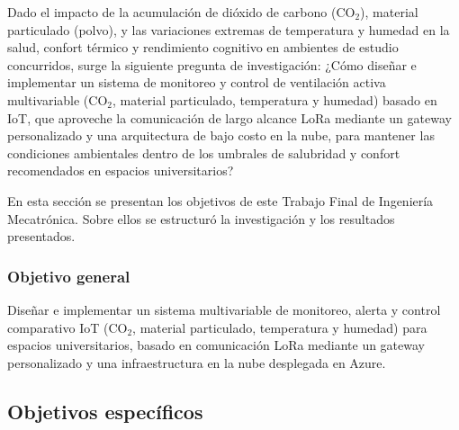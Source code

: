 Dado el impacto de la acumulación de dióxido de carbono (CO\(_2\)), material particulado (polvo), y las variaciones extremas de temperatura y humedad en la salud, confort térmico y rendimiento cognitivo en ambientes de estudio concurridos, surge la siguiente pregunta de investigación: ¿Cómo diseñar e implementar un sistema de monitoreo y control de ventilación activa multivariable (CO\(_2\), material particulado, temperatura y humedad) basado en IoT, que aproveche la comunicación de largo alcance LoRa mediante un gateway personalizado y una arquitectura de bajo costo en la nube, para mantener las condiciones ambientales dentro de los umbrales de salubridad y confort recomendados en espacios universitarios?


En esta sección se presentan los objetivos de este Trabajo Final de Ingeniería Mecatrónica. Sobre ellos se estructuró la investigación y los resultados presentados.

\subsubsection*{Objetivo general}

Diseñar e implementar un sistema multivariable de monitoreo, alerta y control comparativo IoT (CO\(_2\), material particulado, temperatura y humedad) para espacios universitarios, basado en comunicación LoRa mediante un gateway personalizado y una infraestructura en la nube desplegada en Azure.

\subsection*{Objetivos específicos}

